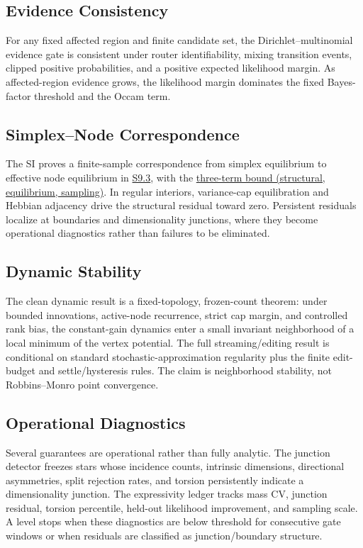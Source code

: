 \documentclass[11pt]{article}
\theoremstyle{definition}
\theoremstyle{plain}
\begin{document}
\subsection{Evidence Consistency}
For any fixed affected region and finite candidate set, the Dirichlet--multinomial evidence gate is consistent under router identifiability, mixing transition events, clipped positive probabilities, and a positive expected likelihood margin. As affected-region evidence grows, the likelihood margin dominates the fixed Bayes-factor threshold and the Occam term.

\subsection{Simplex--Node Correspondence}
The SI proves a finite-sample correspondence from simplex equilibrium to effective node equilibrium in \hyperref[sec:si-simplex-node-correspondence]{S9.3}, with the \hyperref[eq:si-simplex-node-bound]{three-term bound (structural, equilibrium, sampling)}. In regular interiors, variance-cap equilibration and Hebbian adjacency drive the structural residual toward zero. Persistent residuals localize at boundaries and dimensionality junctions, where they become operational diagnostics rather than failures to be eliminated.

\subsection{Dynamic Stability}
The clean dynamic result is a fixed-topology, frozen-count theorem: under bounded innovations, active-node recurrence, strict cap margin, and controlled rank bias, the constant-gain dynamics enter a small invariant neighborhood of a local minimum of the vertex potential. The full streaming/editing result is conditional on standard stochastic-approximation regularity plus the finite edit-budget and settle/hysteresis rules. The claim is neighborhood stability, not Robbins--Monro point convergence.

\subsection{Operational Diagnostics}
Several guarantees are operational rather than fully analytic. The junction detector freezes stars whose incidence counts, intrinsic dimensions, directional asymmetries, split rejection rates, and torsion persistently indicate a dimensionality junction. The expressivity ledger tracks mass CV, junction residual, torsion percentile, held-out likelihood improvement, and sampling scale. A level stops when these diagnostics are below threshold for consecutive gate windows or when residuals are classified as junction/boundary structure.
\end{document}
